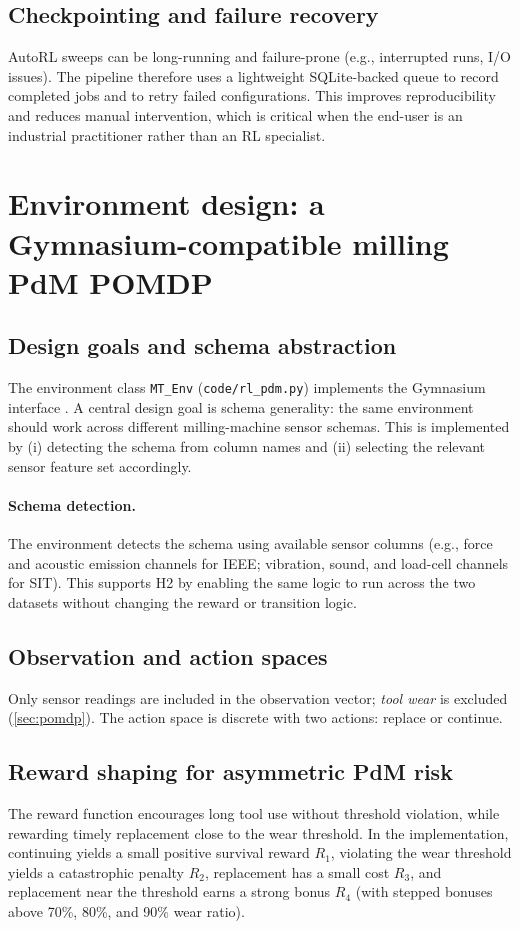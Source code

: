 \documentclass[11pt]{article}
\begin{document}
\subsection{Checkpointing and failure recovery}
AutoRL sweeps can be long-running and failure-prone (e.g., interrupted runs, I/O issues). The pipeline therefore uses a lightweight SQLite-backed queue to record completed jobs and to retry failed configurations. This improves reproducibility and reduces manual intervention, which is critical when the end-user is an industrial practitioner rather than an RL specialist.

\section{Environment design: a Gymnasium-compatible milling PdM POMDP}
\label{sec:env}
\subsection{Design goals and schema abstraction}
The environment class \texttt{MT\_Env} (\texttt{code/rl\_pdm.py}) implements the Gymnasium interface \parencite{Gymnasium2023}. A central design goal is schema generality: the same environment should work across different milling-machine sensor schemas. This is implemented by (i) detecting the schema from column names and (ii) selecting the relevant sensor feature set accordingly.

\paragraph{Schema detection.}
The environment detects the schema using available sensor columns (e.g., force and acoustic emission channels for IEEE; vibration, sound, and load-cell channels for SIT). This supports H2 by enabling the same logic to run across the two datasets without changing the reward or transition logic.

\subsection{Observation and action spaces}
Only sensor readings are included in the observation vector; \emph{tool wear} is excluded (\cref{sec:pomdp}). The action space is discrete with two actions: replace or continue.

\subsection{Reward shaping for asymmetric PdM risk}
\label{sec:reward}
The reward function encourages long tool use without threshold violation, while rewarding timely replacement close to the wear threshold. In the implementation, continuing yields a small positive survival reward $R_1$, violating the wear threshold yields a catastrophic penalty $R_2$, replacement has a small cost $R_3$, and replacement near the threshold earns a strong bonus $R_4$ (with stepped bonuses above 70\%, 80\%, and 90\% wear ratio).
\end{document}
